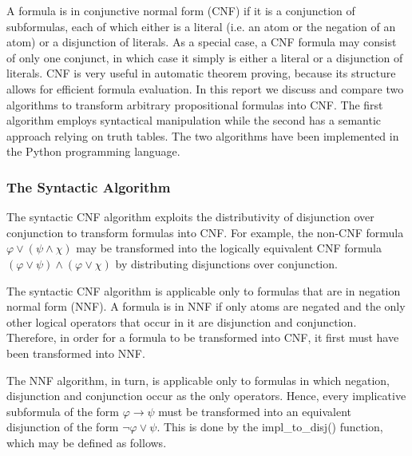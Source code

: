 \documentclass[a4paper,notitlepage]{scrartcl}
\let\phi\varphi
\begin{document}
A formula is in conjunctive normal form (CNF) if it is a conjunction of
subformulas, each of which either is a literal (i.e. an atom or the negation of
an atom) or a disjunction of literals.
As a special case, a CNF formula may consist of only one conjunct, in which
case it simply is either a literal or a disjunction of literals. 
CNF is very useful in automatic theorem proving, because its structure allows
for efficient formula evaluation.
In this report we discuss and compare two algorithms to transform arbitrary
propositional formulas into CNF.
The first algorithm employs syntactical manipulation while the second has a
semantic approach relying on truth tables.
The two algorithms have been implemented in the Python programming language.

\subsubsection{The Syntactic Algorithm}

The syntactic CNF algorithm exploits the distributivity of disjunction over
conjunction to transform formulas into CNF.
For example, the non-CNF formula $\phi \lor (\psi \land \chi)$ may be
transformed into the logically equivalent CNF formula $(\phi \lor \psi) \land
(\phi \lor \chi)$ by distributing disjunctions over conjunction.

The syntactic CNF algorithm is applicable only to formulas that are in negation
normal form (NNF).
A formula is in NNF if only atoms are negated and the only other logical
operators that occur in it are disjunction and conjunction.
Therefore, in order for a formula to be transformed into CNF, it first must
have been transformed into NNF.

The NNF algorithm, in turn, is applicable only to formulas in which negation,
disjunction and conjunction occur as the only operators.
Hence, every implicative subformula of the form $\phi \to \psi$ must be
transformed into an equivalent disjunction of the form $\lnot\phi \lor \psi$.
This is done by the impl\_to\_disj() function, which may be defined as follows.
\end{document}
